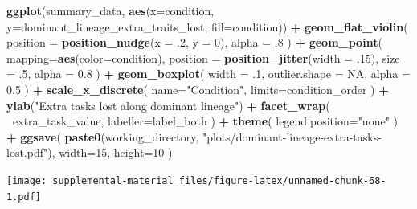\documentclass[]{book}
\newenvironment{Shaded}{\begin{snugshade}}{\end{snugshade}}
\newcommand{\DataTypeTok}[1]{\textcolor[rgb]{0.13,0.29,0.53}{#1}}
\newcommand{\DecValTok}[1]{\textcolor[rgb]{0.00,0.00,0.81}{#1}}
\newcommand{\FloatTok}[1]{\textcolor[rgb]{0.00,0.00,0.81}{#1}}
\newcommand{\KeywordTok}[1]{\textcolor[rgb]{0.13,0.29,0.53}{\textbf{#1}}}
\newcommand{\NormalTok}[1]{#1}
\newcommand{\OperatorTok}[1]{\textcolor[rgb]{0.81,0.36,0.00}{\textbf{#1}}}
\newcommand{\OtherTok}[1]{\textcolor[rgb]{0.56,0.35,0.01}{#1}}
\newcommand{\StringTok}[1]{\textcolor[rgb]{0.31,0.60,0.02}{#1}}
\begin{document}
\begin{Shaded}
\begin{Highlighting}[]
\KeywordTok{ggplot}\NormalTok{(summary_data, }\KeywordTok{aes}\NormalTok{(}\DataTypeTok{x=}\NormalTok{condition, }\DataTypeTok{y=}\NormalTok{dominant_lineage_extra_traits_lost, }\DataTypeTok{fill=}\NormalTok{condition)) }\OperatorTok{+}
\StringTok{  }\KeywordTok{geom_flat_violin}\NormalTok{(}
    \DataTypeTok{position =} \KeywordTok{position_nudge}\NormalTok{(}\DataTypeTok{x =} \FloatTok{.2}\NormalTok{, }\DataTypeTok{y =} \DecValTok{0}\NormalTok{),}
    \DataTypeTok{alpha =} \FloatTok{.8}
\NormalTok{  ) }\OperatorTok{+}
\StringTok{  }\KeywordTok{geom_point}\NormalTok{(}
    \DataTypeTok{mapping=}\KeywordTok{aes}\NormalTok{(}\DataTypeTok{color=}\NormalTok{condition),}
    \DataTypeTok{position =} \KeywordTok{position_jitter}\NormalTok{(}\DataTypeTok{width =} \FloatTok{.15}\NormalTok{),}
    \DataTypeTok{size =} \FloatTok{.5}\NormalTok{,}
    \DataTypeTok{alpha =} \FloatTok{0.8}
\NormalTok{  ) }\OperatorTok{+}
\StringTok{  }\KeywordTok{geom_boxplot}\NormalTok{(}
    \DataTypeTok{width =} \FloatTok{.1}\NormalTok{,}
    \DataTypeTok{outlier.shape =} \OtherTok{NA}\NormalTok{,}
    \DataTypeTok{alpha =} \FloatTok{0.5}
\NormalTok{  ) }\OperatorTok{+}
\StringTok{  }\KeywordTok{scale_x_discrete}\NormalTok{(}
    \DataTypeTok{name=}\StringTok{"Condition"}\NormalTok{,}
    \DataTypeTok{limits=}\NormalTok{condition_order}
\NormalTok{  ) }\OperatorTok{+}
\StringTok{  }\KeywordTok{ylab}\NormalTok{(}\StringTok{"Extra tasks lost along dominant lineage"}\NormalTok{) }\OperatorTok{+}
\StringTok{  }\KeywordTok{facet_wrap}\NormalTok{(}
    \OperatorTok{~}\NormalTok{extra_task_value,}
    \DataTypeTok{labeller=}\NormalTok{label_both}
\NormalTok{  ) }\OperatorTok{+}
\StringTok{  }\KeywordTok{theme}\NormalTok{(}
    \DataTypeTok{legend.position=}\StringTok{"none"}
\NormalTok{  ) }\OperatorTok{+}
\StringTok{  }\KeywordTok{ggsave}\NormalTok{(}
    \KeywordTok{paste0}\NormalTok{(working_directory, }\StringTok{"plots/dominant-lineage-extra-tasks-lost.pdf"}\NormalTok{),}
    \DataTypeTok{width=}\DecValTok{15}\NormalTok{,}
    \DataTypeTok{height=}\DecValTok{10}
\NormalTok{  )}
\end{Highlighting}
\end{Shaded}

\texttt{[image: supplemental-material\_files/figure-latex/unnamed-chunk-68-1.pdf]}

\begin{Shaded}
\end{Shaded}
\end{document}
